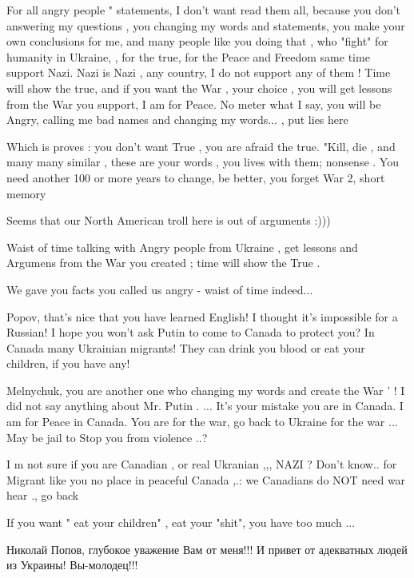 \begin{itemize}
\begin{itemize}

For all angry people " statements, I don't want read them all, because you
don't answering my questions , you changing my words and statements, you make
your own conclusions for me, and many people like you doing that , who "fight"
for humanity in Ukraine, , for the true, for the Peace and Freedom same time
support Nazi. Nazi is Nazi , any country, I do not support any of them ! Time
will show the true, and if you want the War , your choice , you will get
lessons from the War you support, I am for Peace. No meter what I say, you will
be Angry, calling me bad names and changing my words... , put lies here

Which is proves : you don't want True , you are afraid the true. "Kill, die ,
and many many similar , these are your words , you lives with them; nonsense .
You need another 100 or more years to change, be better, you forget War 2,
short memory


Seems that our North American troll here is out of arguments :)))

Waist of time talking with Angry people from Ukraine , get lessons and Argumens from the War you created ; time will show the True .

We gave you facts you called us angry - waist of time indeed...


Popov, that's nice that you have learned English! I thought it's impossible for
a Russian! I hope you won't ask Putin to come to Canada to protect you? In
Canada many Ukrainian migrants! They can drink you blood or eat your children,
if you have any!

Melnychuk, you are another one who changing my words and create the War ' ! I did not say anything about Mr. Putin . ... It's your mistake you are in Canada. I am for Peace in Canada. You are for the war, go back to Ukraine for the war ... May be jail to Stop you from violence ..?

I m not sure if you are Canadian , or real Ukranian ,,,
NAZI ? Don't know.. for Migrant like you no place in peaceful Canada ,.: we Canadians do NOT need war hear ., go back

If you want " eat your children" , eat your "shit", you have too much ...

Николай Попов, глубокое уважение Вам от меня!!! И привет от адекватных людей из Украины! Вы-молодец!!!


\end{itemize}
\end{itemize}
